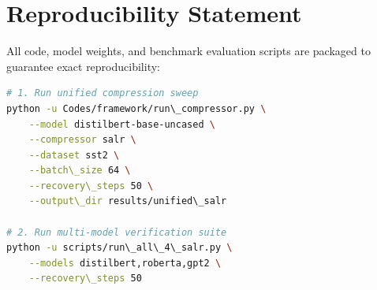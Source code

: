 \section{Reproducibility Statement}
All code, model weights, and benchmark evaluation scripts are packaged to guarantee exact reproducibility:
\begin{lstlisting}[language=bash]
# 1. Run unified compression sweep
python -u Codes/framework/run\_compressor.py \
    --model distilbert-base-uncased \
    --compressor salr \
    --dataset sst2 \
    --batch\_size 64 \
    --recovery\_steps 50 \
    --output\_dir results/unified\_salr

# 2. Run multi-model verification suite
python -u scripts/run\_all\_4\_salr.py \
    --models distilbert,roberta,gpt2 \
    --recovery\_steps 50
\end{lstlisting}

